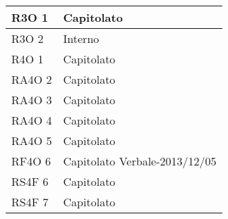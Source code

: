 \begin{center}
\begin{longtable}{ | p{5cm} | p{5cm} |}
        R3O 1 &  Capitolato \newline  \\ \hline      
        R3O 2 &  Interno \newline  \\ \hline      
        R4O 1 &  Capitolato \newline  \\ \hline      
        RA4O 2 &  Capitolato \newline  \\ \hline      
        RA4O 3 &  Capitolato \newline  \\ \hline      
        RA4O 4 &  Capitolato \newline  \\ \hline      
        RA4O 5 &  Capitolato \newline  \\ \hline      
        RF4O 6 &  Capitolato \newline  Verbale-2013/12/05 \newline  \\ \hline      
        RS4F 6 &  Capitolato \newline  \\ \hline      
        RS4F 7 &  Capitolato \newline  \\ \hline     
      \end{longtable}
      \egroup
      \end{center}  
\clearpage


